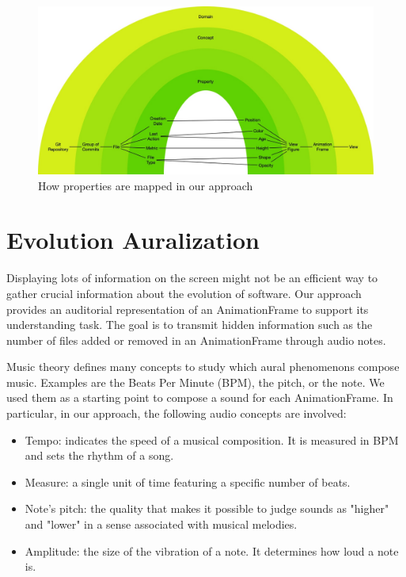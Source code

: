 \begin{figure}
    \center
    \includegraphics[width=\textwidth]{ApproachMapping.jpg}
    \caption{How properties are mapped in our approach}
    \label{fig:ApproachMapping}
\end{figure}



\section{Evolution Auralization}
\label{sec:audioApproach}
Displaying lots of information on the screen might not be an efficient way to gather crucial information about the evolution of software. Our approach provides an auditorial representation of an AnimationFrame to support its understanding task. The goal is to transmit hidden information such as the number of files added or removed in an AnimationFrame through audio notes. 

Music theory defines many concepts to study which aural phenomenons compose music. Examples are the Beats Per Minute (BPM), the pitch, or the note. We used them as a starting point to compose a sound for each AnimationFrame. In particular, in our approach, the following audio concepts are involved:
\begin{itemize}
    \item Tempo: indicates the speed of a musical composition. It is measured in BPM and sets the rhythm of a song. 
    \item Measure: a single unit of time featuring a specific number of beats. 
	\item Note's pitch: the quality that makes it possible to judge sounds as "higher" and "lower" in a sense associated with musical melodies.
	\item Amplitude: the size of the vibration of a note. It determines how loud a note is.
\end{itemize}

